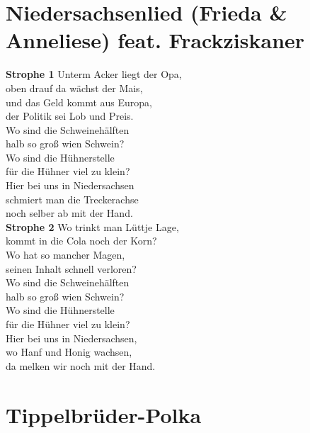 \documentclass[twoside,8pt]{scrartcl}
\begin{document}
\section{Niedersachsenlied (Frieda \& Anneliese) feat. Frackziskaner}
\textbf{Strophe 1}
\newline
Unterm Acker liegt der Opa,\\
oben drauf da wächst der Mais,\\
und das Geld kommt aus Europa,\\
der Politik sei Lob und Preis.\\
\newline
Wo sind die Schweinehälften\\
halb so groß wien Schwein?\\
Wo sind die Hühnerstelle\\
für die Hühner viel zu klein?\\
Hier bei uns in Niedersachsen\\
schmiert man die Treckerachse\\
noch selber ab mit der Hand.\\
\newline
\textbf{Strophe 2}
\newline
Wo trinkt man Lüttje Lage,\\
kommt in die Cola noch der Korn?\\
Wo hat so mancher Magen,\\
seinen Inhalt schnell verloren?\\
\newline
Wo sind die Schweinehälften\\
halb so groß wien Schwein?\\
Wo sind die Hühnerstelle\\
für die Hühner viel zu klein?\\
Hier bei uns in Niedersachsen,\\
wo Hanf und Honig wachsen,\\
da melken wir noch mit der Hand.\\



\clearpage
\section{Tippelbrüder-Polka}
\end{document}
